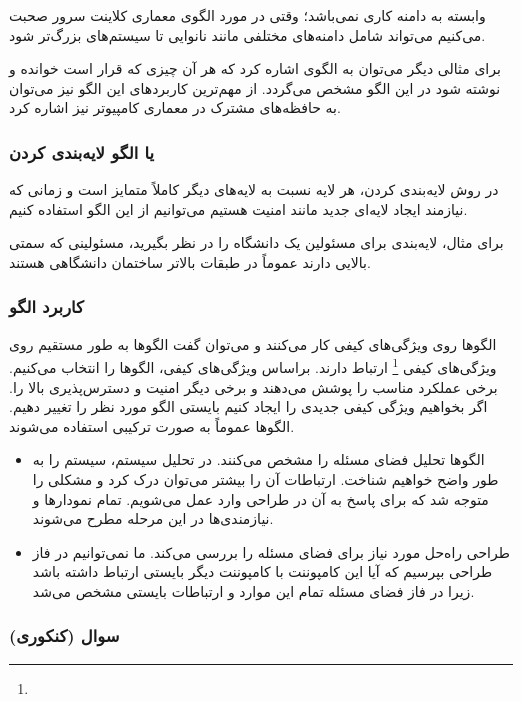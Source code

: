 وابسته به دامنه کاری نمی‌باشد؛ وقتی در مورد الگوی معماری کلاینت سرور صحبت
می‌کنیم می‌تواند شامل دامنه‌های مختلفی مانند نانوایی تا سیستم‌های بزرگ‌تر شود.

برای مثالی دیگر می‌توان به الگوی  اشاره کرد که هر آن چیزی که
قرار است خوانده و نوشته شود در این الگو مشخص می‌گردد. از مهم‌ترین کاربرد‌های این
الگو نیز می‌توان به حافظه‌های مشترک در معماری کامپیوتر نیز اشاره کرد.

\subsubsection{ یا الگو لایه‌بندی کردن}

در روش لایه‌بندی کردن، هر لایه نسبت به لایه‌های دیگر کاملاً متمایز است و زمانی
که نیازمند ایجاد لایه‌ای جدید مانند امنیت هستیم می‌توانیم از این الگو استفاده
کنیم.

برای مثال، لایه‌بندی برای مسئولین یک دانشگاه را در نظر بگیرید، مسئولینی که سمتی
بالایی دارند عموماً در طبقات بالاتر ساختمان دانشگاهی هستند.

\subsubsection{کاربرد الگو}

الگو‌ها روی ویژگی‌های کیفی کار می‌کنند و می‌توان گفت الگو‌ها به طور مستقیم روی
ویژگی‌های کیفی \footnote{} ارتباط دارند. براساس ویژگی‌های
کیفی، الگو‌ها را انتخاب می‌کنیم. برخی عملکرد مناسب را پوشش می‌دهند و برخی دیگر
امنیت و دسترس‌پذیری بالا را. اگر بخواهیم ویژگی کیفی جدیدی را ایجاد کنیم بایستی
الگو مورد نظر را تغییر دهیم. الگو‌ها عموماً به صورت ترکیبی استفاده می‌شوند.

\begin{itemize}
    \item الگو‌ها تحلیل فضای مسئله را مشخص می‌کنند. در تحلیل سیستم، سیستم را به
    طور واضح خواهیم شناخت. ارتباطات آن را بیشتر می‌توان درک کرد و مشکلی را متوجه
    شد که برای پاسخ به آن در طراحی وارد عمل می‌شویم. تمام نمودار‌ها و
    نیازمندی‌ها در این مرحله مطرح می‌شوند.
    \item طراحی راه‌حل مورد نیاز برای فضای مسئله را بررسی می‌کند. ما نمی‌توانیم
    در فاز طراحی بپرسیم که آیا این کامپوننت با کامپوننت دیگر بایستی ارتباط داشته
    باشد زیرا در فاز فضای مسئله تمام این موارد و ارتباطات بایستی مشخص می‌شد.
\end{itemize}

\subsubsection*{سوال (کنکوری)}


